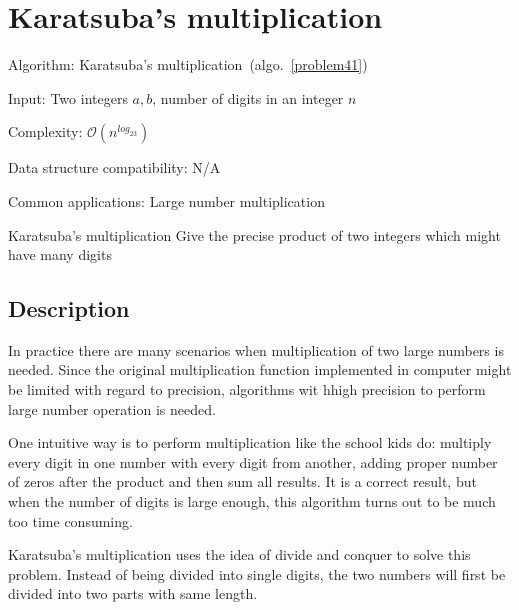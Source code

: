 \documentclass{article}
\begin{document}
\fi

%
%

\def\pbname{Karatsuba's multiplication} %

\section{\pbname} 

\begin{overview}
\item [Algorithm:]Karatsuba's multiplication~(algo.~\ref{problem41}) 
\item [Input:] Two integers $a,b$, number of digits in an integer $n$
\item [Complexity:] $\mathcal{O}(n^{log_23})$
\item [Data structure compatibility:] N/A
\item [Common applications:] Large number multiplication
\end{overview}



\begin{problem}{\pbname}
	Give the precise product of two integers which might have many digits
\end{problem}

\subsection*{Description}

In practice there are many scenarios when multiplication of two large numbers is needed. Since the original multiplication function implemented in computer might be limited with regard to precision, algorithms wit hhigh precision to perform large number operation is needed.

One intuitive way is to perform multiplication like the school kids do: multiply every digit in one number with every digit from another, adding proper number of zeros after the product and then sum all results. It is a correct result, but when the number of digits is large enough, this algorithm turns out to be much too time consuming.

Karatsuba's multiplication uses the idea of divide and conquer to solve this problem. Instead of being divided into single digits, the two numbers will first be divided into two parts with same length. 
\end{document}
